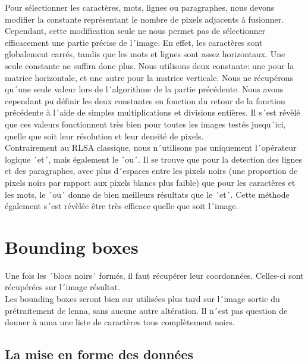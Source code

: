 Pour sélectionner les caractères, mots, lignes ou paragraphes, nous devons modifier la constante représentant le nombre de pixels adjacents à fusionner. Cependant, cette modification seule ne nous permet pas de sélectionner efficacement une partie précise de l´image. En effet, les caractères sont globalement carrés, tandis que les mots et lignes sont assez horizontaux. Une seule constante ne suffira donc plus. Nous utilisons deux constante: une pour la matrice horizontale, et une autre pour la matrice verticale. Nous ne récupérons qu´une seule valeur lors de l´algorithme de la partie précédente. Nous avons cependant pu définir les deux constantes en fonction du retour de la fonction précédente à l´aide de simples multiplications et divisions entières. Il s´est révèlé que ces valeurs fonctionnent très bien pour toutes les images testés jusqu´ici, quelle que soit leur résolution et leur densité de pixels.\\
Contrairement au RLSA classique, nous n´utilisons pas uniquement l´opérateur logique ´et´, mais également le ´ou´. Il se trouve que pour la detection des lignes et des paragraphes, avec plus d´espaces entre les pixels noirs (une proportion de pixels noirs par rapport aux pixels blancs plus faible) que pour les caractères et les mots, le ´ou´ donne de bien meilleurs résultats que le ´et´. Cette méthode également s´est révèlée être très efficace quelle que soit l´image.


\section{Bounding boxes}

Une fois les ´blocs noirs´ formés, il faut récupérer leur coordonnées. Celles-ci sont récupérées sur l´image résultat.\\ %
Les bounding boxes seront bien sur utilisées plus tard sur l´image sortie du prétraitement de lenna, sans aucune autre altération. Il n´est pas question de donner à anna une liste de caractères tous complètement noirs.


\subsection{La mise en forme des données}

